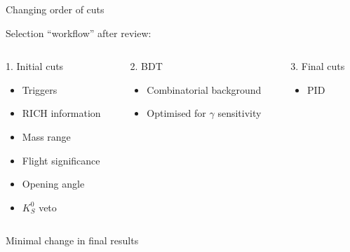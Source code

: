 \documentclass[xcolor={dvipsnames}]{beamer}
\begin{document}
\begin{frame}{Changing order of cuts}
  \begin{center}
    {\Large Selection ``workflow'' after review:}
  \end{center}
  \vspace{0.4cm}
  \begin{columns}
    \begin{column}{0.33\textwidth}
      1. Initial cuts
      \begin{itemize}
        \item{Triggers}
        \item{RICH information}
        \item{Mass range}
        \item{Flight significance}
        \item{Opening angle}
        \item{$K_S^0$ veto}
      \end{itemize}
    \end{column}
    \begin{column}{0.33\textwidth}
      2. BDT
      \begin{itemize}
        \item{Combinatorial background}
        \item{Optimised for $\gamma$ sensitivity}
      \end{itemize}
    \end{column}
    \begin{column}{0.33\textwidth}
      3. Final cuts
      \begin{itemize}
        \item{PID}
      \end{itemize}
    \end{column}
  \end{columns}
  \vspace{0.2cm}
  \begin{center}
    {\Large Minimal change in final results}
  \end{center}
\end{frame}
\end{document}

